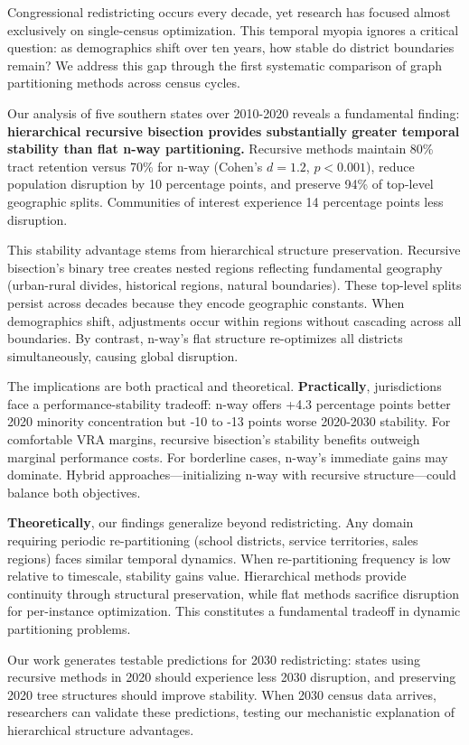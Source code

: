 Congressional redistricting occurs every decade, yet research has focused almost exclusively on single-census optimization. This temporal myopia ignores a critical question: as demographics shift over ten years, how stable do district boundaries remain? We address this gap through the first systematic comparison of graph partitioning methods across census cycles.

Our analysis of five southern states over 2010-2020 reveals a fundamental finding: \textbf{hierarchical recursive bisection provides substantially greater temporal stability than flat n-way partitioning.} Recursive methods maintain 80\% tract retention versus 70\% for n-way (Cohen's $d=1.2$, $p<0.001$), reduce population disruption by 10 percentage points, and preserve 94\% of top-level geographic splits. Communities of interest experience 14 percentage points less disruption.

This stability advantage stems from hierarchical structure preservation. Recursive bisection's binary tree creates nested regions reflecting fundamental geography (urban-rural divides, historical regions, natural boundaries). These top-level splits persist across decades because they encode geographic constants. When demographics shift, adjustments occur within regions without cascading across all boundaries. By contrast, n-way's flat structure re-optimizes all districts simultaneously, causing global disruption.

The implications are both practical and theoretical. \textbf{Practically}, jurisdictions face a performance-stability tradeoff: n-way offers +4.3 percentage points better 2020 minority concentration but -10 to -13 points worse 2020-2030 stability. For comfortable VRA margins, recursive bisection's stability benefits outweigh marginal performance costs. For borderline cases, n-way's immediate gains may dominate. Hybrid approaches—initializing n-way with recursive structure—could balance both objectives.

\textbf{Theoretically}, our findings generalize beyond redistricting. Any domain requiring periodic re-partitioning (school districts, service territories, sales regions) faces similar temporal dynamics. When re-partitioning frequency is low relative to timescale, stability gains value. Hierarchical methods provide continuity through structural preservation, while flat methods sacrifice disruption for per-instance optimization. This constitutes a fundamental tradeoff in dynamic partitioning problems.

Our work generates testable predictions for 2030 redistricting: states using recursive methods in 2020 should experience less 2030 disruption, and preserving 2020 tree structures should improve stability. When 2030 census data arrives, researchers can validate these predictions, testing our mechanistic explanation of hierarchical structure advantages.


